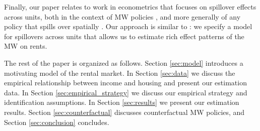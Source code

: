 Finally, our paper relates to work in econometrics that focuses on spillover 
effects across units,
both in the context of MW policies 
\parencite{Kuehn2016, JardimEtAl2022discontinuity}, 
and more generally of any policy that spills over spatially
\parencite{DelgadoFlorax2015, Butts2021}.
Our approach is similar to \textcite{GiroudMueller2019}: we specify a model for 
spillovers across units that allows us to estimate rich effect patterns of the 
MW on rents.

The rest of the paper is organized as follows.
Section \ref{sec:model} introduces a motivating model of the rental market.
In Section \ref{sec:data} we discuss the empirical relationship between income 
and housing and present our estimation data.
In Section \ref{sec:empirical_strategy} we discuss our empirical strategy and
identification assumptions.
In Section \ref{sec:results} we present our estimation results.
Section \ref{sec:counterfactual} discusses counterfactual MW policies, and
Section \ref{sec:conclusion} concludes.
